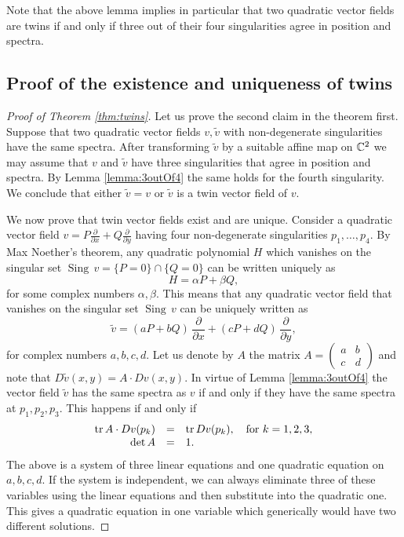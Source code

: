 \documentclass[phd,tocprelim]{cornell}
\begin{document}
Note that the above lemma implies in particular that two quadratic vector fields are twins if and only if three out of their four singularities agree in position and spectra.


\subsection{Proof of the existence and uniqueness of twins}

\begin{proof}[Proof of Theorem \ref*{thm:twins}]
Let us prove the second claim in the theorem first. Suppose that two quadratic vector fields $v,\tilde{v}$ with non-degenerate singularities have the same spectra. After transforming $\tilde{v}$ by a suitable affine map on $\mathbb{C}^2$ we may assume that $v$ and $\tilde{v}$ have three singularities that agree in position and spectra. By Lemma \ref{lemma:3outOf4} the same holds for the fourth singularity. We conclude that either $\tilde{v}=v$ or $\tilde{v}$ is a twin vector field of $v$.

We now prove that twin vector fields exist and are unique. Consider a quadratic vector field $v=P\frac{\partial}{\partial x}+Q\frac{\partial}{\partial y}$ having four non-degenerate singularities $p_1,\ldots,p_4$. By Max Noether's theorem, any quadratic polynomial $H$ which vanishes on the singular set $\operatorname{Sing}\,v=\{P=0\}\cap\{Q=0\}$ can be written uniquely as
\[ H=\alpha P+\beta Q, \]
for some complex numbers $\alpha,\beta$. This means that any quadratic vector field that vanishes on the singular set $\operatorname{Sing}\,v$ can be uniquely written as
\[ \tilde{v}=(aP+bQ)\,\frac{\partial}{\partial x}+(cP+dQ)\,\frac{\partial}{\partial y}, \]
for complex numbers $a,b,c,d$. Let us denote by $A$ the matrix $A=\left(\begin{smallmatrix}a&b\\c&d\end{smallmatrix}\right)$ and note that $D\tilde{v}(x,y)=A\cdot Dv(x,y)$. In virtue of Lemma \ref{lemma:3outOf4} the vector field $\tilde{v}$ has the same spectra as $v$ if and only if they have the same spectra at $p_1,p_2,p_3$. This happens if and only if
\begin{equation}\label{eq:system} \begin{array}{rcl}
\operatorname{tr}{A\cdot Dv(p_k)}&=&\operatorname{tr}{Dv(p_k)},\quad \mbox{for } k=1,2,3, \\
\det{A} &=& 1. \\
\end{array} \end{equation}
The above is a system of three linear equations and one quadratic equation on $a,b,c,d$. If the system is independent, we can always eliminate three of these variables using the linear equations and then substitute into the quadratic one. This gives a quadratic equation in one variable which generically would have two different solutions. 


\end{proof}
\end{document}
